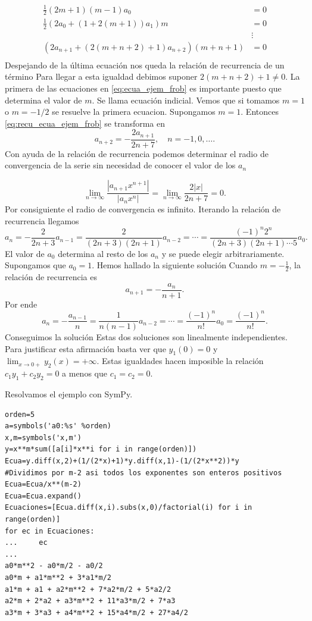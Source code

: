 \begin{ejemplo}{}
\begin{equation}\label{eq:ecua_ejem_frob}
    \begin{split}
      \frac12\left(2m+1\right)(m-1) a_0&=0\\
       \frac{1}{2}  \left(   2 a_{0} + (1+2(m+1)) a_{1}\right)m&=0\\
                                      &\vdots\\
     \left(   2a_{n+1}+ (2(m+n+2)+1)a_{n+2}  \right)(m+n+1) &=0\\
    \end{split}
\end{equation}
Despejando de la última ecuación nos queda la relación de recurrencia de un término
Para llegar a esta igualdad debimos suponer $2(m+n+2)+1\neq 0$.
La primera de las ecuaciones en \eqref{eq:ecua_ejem_frob} es importante puesto que determina el valor de $m$. Se llama ecuación indicial. Vemos que si tomamos $m=1$ o $m=-1/2$ se resuelve la primera ecuacion. Supongamos $m=1$. Entonces \eqref{eq:recu_ecua_ejem_frob} se transforma en
\[
a_{n+2}=-\frac{2a_{n+1}}{2n+7},\quad n=-1,0,\ldots.
\]
Con ayuda de la relación de recurrencia podemos determinar el radio de convergencia de la serie sin necesidad de conocer el valor de los $a_n$

\[\lim_{n\to\infty}\frac{|a_{n+1}x^{n+1}|}{|a_{n}x^{n}|}=
\lim_{n\to\infty}\frac{2|x|}{2n+7}=0.\]
Por consiguiente el radio de convergencia es infinito.  Iterando la relación de recurrencia llegamos
\[a_{n}=-\frac{2}{2n+3}a_{n-1}=\frac{2}{(2n+3)(2n+1)}a_{n-2}=\cdots=
\frac{(-1)^n2^{n}}{(2n+3)(2n+1)\cdots 5}a_0.\]
El valor de $a_0$ determina al resto de los $a_n$ y se puede elegir arbitrariamente. Supongamos que $a_0=1$. Hemos hallado la siguiente solución
Cuando $m=-\frac12$, la relación de recurrencia es
\[a_{n+1}=-\frac{a_{n}}{n+1}.\]
Por ende
\[a_n=-\frac{a_{n-1}}{n}=\frac{1}{n(n-1)}a_{n-2}=\cdots=\frac{(-1)^n}{n!}a_{0}=\frac{(-1)^n}{n!}.\]
Conseguimos la solución
Estas dos soluciones son linealmente independientes. Para justificar esta afirmación basta ver que $y_1(0)=0$ y $\lim_{x\to 0+}y_2(x)=+\infty$. Estas igualdades hacen imposible la relación $c_1y_1+c_2y_2=0$ a menos que $c_1=c_2=0$.

Resolvamos el ejemplo con SymPy.

\begin{lstlisting}
orden=5
a=symbols('a0:%s' %orden)
x,m=symbols('x,m')
y=x**m*sum([a[i]*x**i for i in range(orden)])
Ecua=y.diff(x,2)+(1/(2*x)+1)*y.diff(x,1)-(1/(2*x**2))*y
#Dividimos por m-2 asi todos los exponentes son enteros positivos
Ecua=Ecua/x**(m-2)
Ecua=Ecua.expand()
Ecuaciones=[Ecua.diff(x,i).subs(x,0)/factorial(i) for i in range(orden)]
for ec in Ecuaciones:
...     ec
...
a0*m**2 - a0*m/2 - a0/2
a0*m + a1*m**2 + 3*a1*m/2
a1*m + a1 + a2*m**2 + 7*a2*m/2 + 5*a2/2
a2*m + 2*a2 + a3*m**2 + 11*a3*m/2 + 7*a3
a3*m + 3*a3 + a4*m**2 + 15*a4*m/2 + 27*a4/2


\end{lstlisting}
\end{ejemplo}

